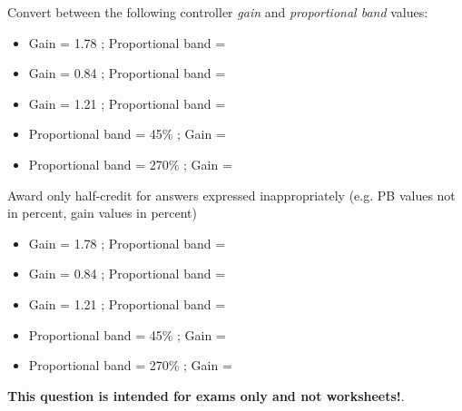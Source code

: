 

Convert between the following controller {\it gain} and {\it proportional band} values:

\vskip 10pt

\begin{itemize}
\item{} Gain = 1.78 ; Proportional band = \underbar{\hskip 50pt}
\vskip 5pt
\item{} Gain = 0.84 ; Proportional band = \underbar{\hskip 50pt}
\vskip 5pt
\item{} Gain = 1.21 ; Proportional band = \underbar{\hskip 50pt}
\vskip 5pt
\item{} Proportional band = 45\% ; Gain = \underbar{\hskip 50pt}
\vskip 5pt
\item{} Proportional band = 270\% ; Gain = \underbar{\hskip 50pt}
\end{itemize}







Award only half-credit for answers expressed inappropriately (e.g. PB values not in percent, gain values in percent)

\begin{itemize}
\item{} Gain = 1.78 ; Proportional band = 
\item{} Gain = 0.84 ; Proportional band = 
\item{} Gain = 1.21 ; Proportional band = 
\item{} Proportional band = 45\% ; Gain = 
\item{} Proportional band = 270\% ; Gain = 
\end{itemize}







{\bf This question is intended for exams only and not worksheets!}.



